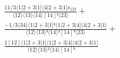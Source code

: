 \documentclass[varwidth, border=5pt]{standalone}
\begin{document}
\begin{my}
$\begin{gathered}
\scriptscriptstyle\frac{11/3⟨1|2+3|1]⟨4|2+3|1]s_{123}}{⟨12⟩⟨13⟩⟨14⟩[14]²⟨23⟩} +\\
\scriptscriptstyle\frac{-1/3⟨34⟩⟨1|2+3|1]²⟨1|2+3|4]⟨4|2+3|1]}{⟨12⟩⟨13⟩²⟨14⟩²[14]³⟨23⟩} +\\
\scriptscriptstyle\frac{1[12]⟨1|2+3|1]⟨1|2+3|4]⟨4|2+3|1]}{⟨12⟩⟨13⟩²⟨14⟩[14]³} \phantom{+}
\end{gathered}$
\end{my}
\end{document}
